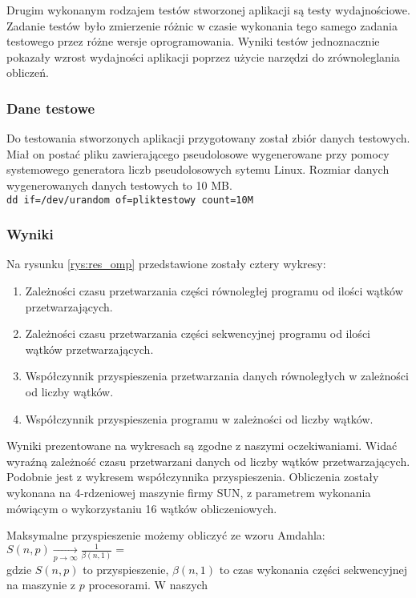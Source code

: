 \documentclass[a4paper,12pt]{article}
\begin{document}
Drugim wykonanym rodzajem testów stworzonej aplikacji są testy wydajnościowe. Zadanie testów było zmierzenie różnic w czasie wykonania tego samego zadania testowego przez różne wersje oprogramowania. Wyniki testów jednoznacznie pokazały wzrost wydajności aplikacji poprzez użycie narzędzi do zrównoleglania obliczeń.

\subsubsection{Dane testowe}

Do testowania stworzonych aplikacji przygotowany został zbiór danych testowych. Miał on postać pliku zawierającego pseudolosowe wygenerowane przy pomocy systemowego generatora liczb pseudolosowych sytemu Linux. Rozmiar danych wygenerowanych danych testowych to 10 MB.\\
\texttt{dd if=/dev/urandom of=pliktestowy count=10M}



\subsubsection{Wyniki}
Na rysunku \ref{rys:res_omp} przedstawione zostały cztery wykresy:
\begin{enumerate}
\item Zależności czasu przetwarzania części równoległej programu od ilości wątków przetwarzających.
\item Zależności czasu przetwarzania części sekwencyjnej programu od ilości wątków przetwarzających.
\item Współczynnik przyspieszenia przetwarzania danych równoległych w zależności od liczby wątków.
\item Współczynnik przyspieszenia programu w zależności od liczby wątków.
\end{enumerate}

Wyniki prezentowane na wykresach są zgodne z naszymi oczekiwaniami. Widać wyraźną
zależność czasu przetwarzani danych od liczby wątków przetwarzających. Podobnie
jest z wykresem współczynnika przyspieszenia. Obliczenia zostały wykonana na
4-rdzeniowej maszynie firmy SUN, z parametrem wykonania mówiącym o wykorzystaniu
16 wątków obliczeniowych.

Maksymalne przyspieszenie możemy obliczyć ze wzoru Amdahla:\\
$S(n,p) \xrightarrow[p \rightarrow \infty]{} \frac{1}{\beta(n, 1)} = $ \\
gdzie $S(n,p)$ to przyspieszenie, $\beta(n, 1)$ to czas wykonania części sekwencyjnej na maszynie z $p$ procesorami. W naszych
\end{document}
